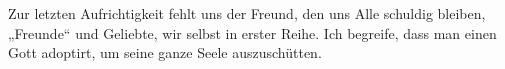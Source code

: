 Zur letzten Aufrichtigkeit fehlt uns der Freund, den uns Alle schuldig bleiben, „Freunde“ und Geliebte, wir selbst in erster Reihe. Ich begreife, dass man einen Gott adoptirt, um seine ganze Seele auszuschütten.
\par

